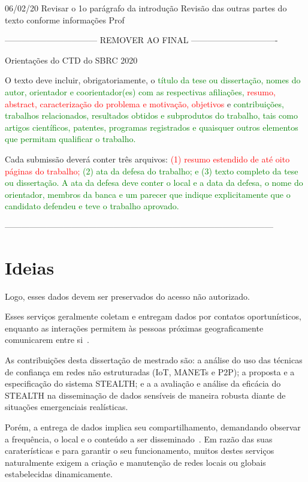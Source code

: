 06/02/20
Revisar o 1o parágrafo da introdução
Revisão das outras partes do texto conforme informações Prof



{\color{red}--------------------------------- REMOVER AO FINAL -------------------------------}

Orientações do CTD do SBRC 2020

O texto deve incluir, obrigatoriamente, o \textcolor{green}{título da tese ou dissertação, nomes do autor, orientador e coorientador(es) com as respectivas afiliações,} \textcolor{red}{resumo, abstract, caracterização do problema e motivação, objetivos} e \textcolor{green}{contribuições, trabalhos relacionados, resultados obtidos e subprodutos do trabalho, tais como artigos científicos, patentes, programas registrados e quaisquer outros elementos que permitam qualificar o trabalho.}

Cada submissão deverá conter três arquivos: \textcolor{red}{(1) resumo estendido de até oito páginas do trabalho;} \textcolor{green}{(2) ata da defesa do trabalho; e (3) texto completo da tese ou dissertação. A ata da defesa deve conter o local e a data da defesa, o nome do orientador, membros da banca e um parecer que indique explicitamente que o candidato defendeu e teve o trabalho aprovado.}

{\color{red}------------------------------------------------------------------------------------------------}

\section*{Ideias}

Logo, esses dados devem ser preservados do acesso não autorizado.


Esses serviços geralmente coletam e entregam dados por contatos oportunísticos, enquanto as interações permitem às pessoas próximas geograficamente comunicarem entre si~\cite{garyfalos2008coupons}.

As contribuições desta dissertação de mestrado são: a análise do uso das técnicas de confiança em redes não estruturadas (IoT, MANETs e P2P); a proposta e a especificação do sistema STEALTH; e a a avaliação e análise da eficácia do STEALTH na disseminação de dados sensíveis de maneira robusta diante de situações emergenciais realísticas.

Porém, a entrega de dados implica seu compartilhamento, demandando observar a frequência, o local e o conteúdo a ser disseminado~\cite{sudhindra2014}. Em razão das suas caraterísticas e para garantir o seu funcionamento, muitos destes serviços naturalmente exigem a criação e manutenção de redes locais ou globais estabelecidas dinamicamente.
 
